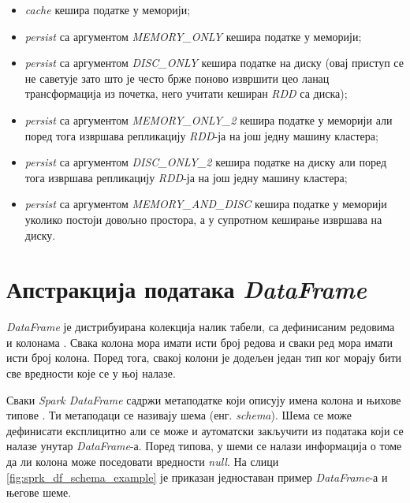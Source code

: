\documentclass[12pt,oneside]{memoir}
\begin{document}
\begin{itemize}
	\item \textit{cache} кешира податке у меморији;

	\item \textit{persist} са аргументом \textit{MEMORY\_ONLY} кешира податке у меморији;

	\item \textit{persist} са аргументом \textit{DISC\_ONLY} кешира податке на диску (овај приступ се не саветује зато што је често брже поново извршити цео ланац трансформација из почетка, него учитати кеширан \textit{RDD} са диска);

	\item \textit{persist} са аргументом \textit{MEMORY\_ONLY\_2} кешира податке у меморији али поред тога извршава репликацију \textit{RDD}-ја на још једну машину кластера;

	\item \textit{persist} са аргументом \textit{DISC\_ONLY\_2} кешира податке на диску али поред тога извршава репликацију \textit{RDD}-ја на још једну машину кластера;

	\item \textit{persist} са аргументом \textit{MEMORY\_AND\_DISC} кешира податке у меморији уколико постоји довољно простора, а у супротном кеширање извршава на диску.
\end{itemize}

\section{Апстракција података \textit{DataFrame}}
\label{sec:spark_df}

\textit{DataFrame} је дистрибуирана колекција налик табели, са дефинисаним редовима и колонама \cite{spark_guide}. Свака колона мора имати исти број редова и сваки ред мора имати исти број колона. Поред тога, свакој колони је додељен један тип ког морају бити све вредности које се у њој налазе.

Сваки \textit{Spark DataFrame} садржи метаподатке који описују имена колона и њихове типове  \cite{spark_guide}. Ти метаподаци се називају шема (енг. \textit{schema}). Шема се може дефинисати експлицитно али се може и аутоматски закључити из података који се налазе унутар \textit{DataFrame}-а. Поред типова, у шеми се налази информација о томе да ли колона може поседовати вредности \textit{null}. На слици \ref{fig:sprk_df_schema_example} је приказан једноставан пример \textit{DataFrame}-а и његове шеме.
\end{document}
